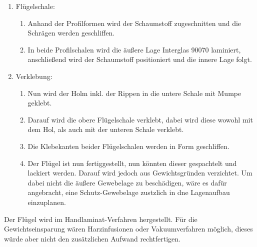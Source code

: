 \begin{enumerate}
	\item Flügelschale:
	\begin{enumerate}
		\item Anhand der Profilformen wird der Schaumstoff zugeschnitten und die Schrägen werden geschliffen.
		\item In beide Profilschalen wird die äußere Lage Interglas 90070 laminiert, anschließend wird der Schaumstoff positioniert und die innere Lage folgt.
	\end{enumerate}
	\item Verklebung:
	\begin{enumerate}
		\item Nun wird der Holm inkl. der Rippen in die untere Schale mit Mumpe geklebt.
		\item Darauf wird die obere Flügelschale verklebt, dabei wird diese wowohl mit dem Hol, als auch mit der unteren Schale verklebt.
		\item Die Klebekanten beider Flügelschalen werden in Form geschliffen.
		\item Der Flügel ist nun fertiggestellt, nun könnten dieser gespachtelt und lackiert werden. Darauf wird jedoch aus Gewichtsgründen verzichtet. Um dabei nicht die äußere Gewebelage zu beschädigen, wäre es dafür angebracht, eine Schutz-Gewebelage zustzlich in dne Lagenaufbau einzuplanen.
	\end{enumerate}
\end{enumerate}

Der Flügel wird im Handlaminat-Verfahren hergestellt. Für die Gewichtseinsparung wären Harzinfusionen oder Vakuumverfahren möglich, dieses würde aber nicht den zusätzlichen Aufwand rechtfertigen.